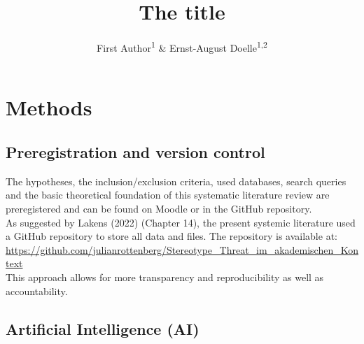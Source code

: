 \documentclass[
  stu]{apa7}
\title{The title}
\author{First Author\textsuperscript{1} \& Ernst-August Doelle\textsuperscript{1,2}}
\date{}
\affiliation{\vspace{0.5cm}\textsuperscript{1} Wilhelm-Wundt-University\\\textsuperscript{2} Konstanz Business School}
\begin{document}
\maketitle

\section{Methods}\label{methods}

\subsection{Preregistration and version control}\label{preregistration-and-version-control}

The hypotheses, the inclusion/exclusion criteria, used databases, search queries and the basic theoretical foundation of this systematic literature review are preregistered and can be found on Moodle or in the GitHub repository.\\
As suggested by Lakens (2022) (Chapter 14), the present systemic literature used a GitHub repository to store all data and files. The repository is available at: \url{https://github.com/julianrottenberg/Stereotype_Threat_im_akademischen_Kontext}\\
This approach allows for more transparency and reproducibility as well as accountability.

\subsection{Artificial Intelligence (AI)}\label{artificial-intelligence-ai}
\end{document}
